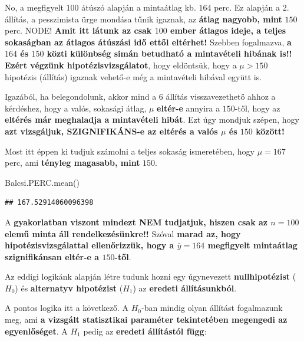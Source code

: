 \documentclass[
]{book}
\newenvironment{Shaded}{\begin{snugshade}}{\end{snugshade}}
\newcommand{\NormalTok}[1]{#1}
\begin{document}
No, a megfigyelt \(100\) átúszó alapján a mintaátlag kb. \(164\) perc. Ez alapján a 2. állítás, a pesszimista ürge mondása tűnik igaznak, az \textbf{átlag nagyobb, mint} \(150\) perc. NODE! \textbf{Amit itt látunk az csak \(100\) ember átlagos ideje, a teljes sokaságban az átlagos átúszási idő ettől eltérhet!}
Szebben fogalmazva, \textbf{a \(164\) és \(150\) közti különbség simán betudható a mintavételi hibának is!!}
\textbf{Ezért végzünk hipotézisvizsgálatot}, hogy eldöntsük, hogy a \(\mu > 150\) hipotézis (állítás) igaznak vehető-e még a mintavételi hibával együtt is.

Igazából, ha belegondolunk, akkor mind a \(6\) állítás visszavezethető ahhoz a kérdéshez, hogy a valós, sokasági átlag, \(\mu\) \textbf{eltér-e} annyira a \(150\)-től, hogy az \textbf{eltérés már meghaladja a mintavételi hibát}. Ezt úgy mondjuk szépen, hogy \textbf{azt vizsgáljuk, SZIGNIFIKÁNS-e az eltérés a valós \(\mu\) és \(150\) között!}

Most itt éppen ki tudjuk számolni a teljes sokaság ismeretében, hogy \(\mu=167\) perc, ami \textbf{tényleg magasabb, mint} \(150\).

\begin{Shaded}
\begin{Highlighting}[]
\NormalTok{Balcsi.PERC.mean()}
\end{Highlighting}
\end{Shaded}

\begin{verbatim}
## 167.52914060096398
\end{verbatim}

A \textbf{gyakorlatban viszont mindezt NEM tudjatjuk, hiszen csak az \(n=100\) elemű minta áll rendelkezésünkre!!} Szóval \textbf{marad az, hogy hipotézisvizsgálattal ellenőrizzük, hogy a \(\bar{y}=164\) megfigyelt mintaátlag szignifikánsan eltér-e a \(150\)-től}.

Az eddigi logikánk alapján létre tudunk hozni egy úgynevezett \textbf{nullhipotézist} (\(H_0\)) és \textbf{alternatyv hipotézist} (\(H_1\)) az \textbf{eredeti állításunkból}.

A pontos logika itt a következő. A \(H_0\)-ban mindig olyan állítást fogalmazunk meg, ami \textbf{a vizsgált statisztikai paraméter tekintetében megengedi az egyenlőséget}.
A \(H_1\) pedig az \textbf{eredeti állítástól függ}:
\end{document}
